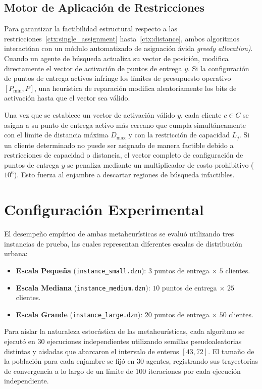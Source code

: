 \documentclass[final,5p,times,twocolumn]{elsarticle}
\begin{document}
\subsection{Motor de Aplicación de Restricciones}
Para garantizar la factibilidad estructural respecto a las restricciones~\eqref{ctx:single_assignment} hasta~\eqref{ctx:distance}, ambos algoritmos interactúan con un módulo automatizado de asignación ávida \textit{greedy allocation)}. Cuando un agente de búsqueda actualiza su vector de posición, modifica directamente el vector de activación de puntos de entrega $y$. Si la configuración de puntos de entrega activos infringe los límites de presupuesto operativo $[P_{\min}, P]$, una heurística de reparación modifica aleatoriamente los bits de activación hasta que el vector sea válido.

Una vez que se establece un vector de activación válido $y$, cada cliente $c \in C$ se asigna a su punto de entrega activo más cercano que cumpla simultáneamente con el límite de distancia máxima $D_{\max}$ y con la restricción de capacidad $L_j$. Si un cliente determinado no puede ser asignado de manera factible debido a restricciones de capacidad o distancia, el vector completo de configuración de puntos de entrega $y$ se penaliza mediante un multiplicador de costo prohibitivo ($10^6$). Esto fuerza al enjambre a descartar regiones de búsqueda infactibles.

\section{Configuración Experimental}
\label{sec:experimental_setup}
El desempeño empírico de ambas metaheurísticas se evaluó utilizando tres instancias de prueba, las cuales representan diferentes escalas de distribución urbana:
\begin{itemize}
    \item \textbf{Escala Pequeña} (\texttt{instance\_small.dzn}): $3$ puntos de entrega $\times$ $5$ clientes.
    \item \textbf{Escala Mediana} (\texttt{instance\_medium.dzn}): $10$ puntos de entrega $\times$ $25$ clientes.
    \item \textbf{Escala Grande} (\texttt{instance\_large.dzn}): $20$ puntos de entrega $\times$ $50$ clientes.
\end{itemize}

Para aislar la naturaleza estocástica de las metaheurísticas, cada algoritmo se ejecutó en $30$ ejecuciones independientes utilizando semillas pseudoaleatorias distintas y aisladas que abarcaron el intervalo de enteros $[43, 72]$. El tamaño de la población para cada enjambre se fijó en $30$ agentes, registrando sus trayectorias de convergencia a lo largo de un límite de $100$ iteraciones por cada ejecución independiente.
\end{document}
